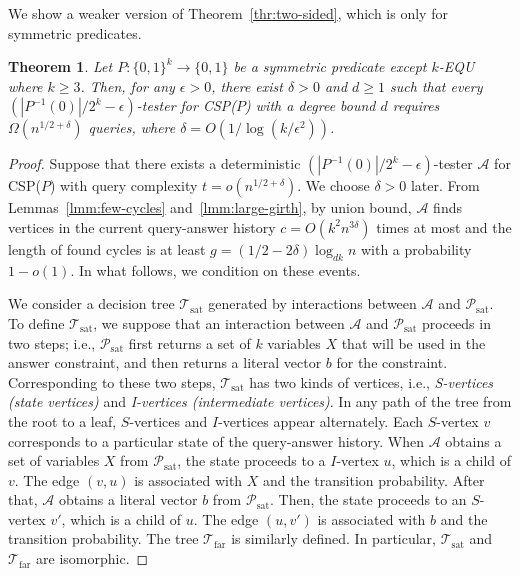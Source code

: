 \documentclass[letterpaper,11pt]{article}
\newtheorem{theorem}{Theorem}[section]
\newcommand{\calpsat}{\mathcal{P}_{\mathrm{sat}}}
\newcommand{\caltsat}{\mathcal{T}_{\mathrm{sat}}}
\newcommand{\caltfar}{\mathcal{T}_{\mathrm{far}}}
\newcommand{\cala}{\mathcal{A}}
\newcommand{\bit}{\{0,1\}}
\newcommand{\csp}[1]{\textsf{CSP}(#1)\xspace}
\newcommand{\kequ}{$k$-\textsf{EQU}\xspace}
\begin{document}
We show a weaker version of Theorem~\ref{thr:two-sided}, which is only for symmetric predicates.
\begin{theorem}\label{thr:two-sided-weak}
  Let $P:\bit^k\to\bit$ be a symmetric predicate except \kequ where $k\geq 3$.
  Then, for any $\epsilon>0$,
  there exist $\delta>0$ and $d\geq 1$ such that 
  every $(|P^{-1}(0)|/2^k-\epsilon)$-tester for \csp{$P$} with a degree bound $d$ requires $\Omega(n^{1/2+\delta})$ queries,
  where $\delta=O(1/\log (k/\epsilon^2))$.
\end{theorem}
\begin{proof}
  Suppose that there exists a deterministic $(|P^{-1}(0)|/2^k-\epsilon)$-tester $\cala$ for \csp{$P$} with query complexity $t=o(n^{1/2+\delta})$.
  We choose $\delta>0$ later.
  From Lemmas~\ref{lmm:few-cycles} and~\ref{lmm:large-girth},
  by union bound,
  $\cala$ finds vertices in the current query-answer history $c=O(k^2n^{3\delta})$ times at most and the length of found cycles is at least $g=(1/2-2\delta)\log_{dk}n$ with a probability $1-o(1)$.
  In what follows, we condition on these events.

  We consider a decision tree $\caltsat$ generated by interactions between $\cala$ and $\calpsat$.
  To define $\caltsat$, 
  we suppose that an interaction between $\cala$ and $\calpsat$ proceeds in two steps;
  i.e., $\calpsat$ first returns a set of $k$ variables $X$ that will be used in the answer constraint,
  and then returns a literal vector $b$ for the constraint.
  Corresponding to these two steps,
  $\caltsat$ has two kinds of vertices, i.e., \textit{S-vertices (state vertices)} and \textit{I-vertices (intermediate vertices)}.
  In any path of the tree from the root to a leaf,
  $S$-vertices and $I$-vertices appear alternately.
  Each $S$-vertex $v$ corresponds to a particular state of the query-answer history.
  When $\cala$ obtains a set of variables $X$ from $\calpsat$,
  the state proceeds to a $I$-vertex $u$,
  which is a child of $v$.
  The edge $(v,u)$ is associated with $X$ and the transition probability.
  After that, $\cala$ obtains a literal vector $b$ from $\calpsat$.
  Then, the state proceeds to an $S$-vertex $v'$,
  which is a child of $u$.
  The edge $(u,v')$ is associated with $b$ and the transition probability.
  The tree $\caltfar$ is similarly defined.
  In particular,
  $\caltsat$ and $\caltfar$ are isomorphic.
    

\end{proof}
\end{document}

